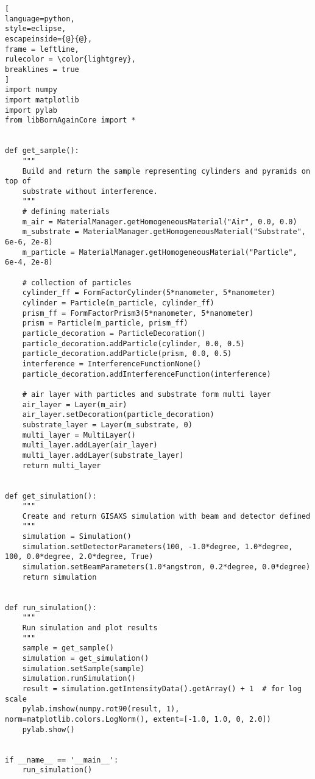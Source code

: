 \begin{lstlisting}[
language=python, 
style=eclipse, 
escapeinside={@}{@},
frame = leftline, 
rulecolor = \color{lightgrey},
breaklines = true
]
import numpy
import matplotlib
import pylab
from libBornAgainCore import *


def get_sample():
    """
    Build and return the sample representing cylinders and pyramids on top of
    substrate without interference.
    """
    # defining materials
    m_air = MaterialManager.getHomogeneousMaterial("Air", 0.0, 0.0)
    m_substrate = MaterialManager.getHomogeneousMaterial("Substrate", 6e-6, 2e-8)
    m_particle = MaterialManager.getHomogeneousMaterial("Particle", 6e-4, 2e-8)

    # collection of particles
    cylinder_ff = FormFactorCylinder(5*nanometer, 5*nanometer)
    cylinder = Particle(m_particle, cylinder_ff)
    prism_ff = FormFactorPrism3(5*nanometer, 5*nanometer)
    prism = Particle(m_particle, prism_ff)
    particle_decoration = ParticleDecoration()
    particle_decoration.addParticle(cylinder, 0.0, 0.5)
    particle_decoration.addParticle(prism, 0.0, 0.5)
    interference = InterferenceFunctionNone()
    particle_decoration.addInterferenceFunction(interference)

    # air layer with particles and substrate form multi layer
    air_layer = Layer(m_air)
    air_layer.setDecoration(particle_decoration)
    substrate_layer = Layer(m_substrate, 0)
    multi_layer = MultiLayer()
    multi_layer.addLayer(air_layer)
    multi_layer.addLayer(substrate_layer)
    return multi_layer


def get_simulation():
    """
    Create and return GISAXS simulation with beam and detector defined
    """
    simulation = Simulation()
    simulation.setDetectorParameters(100, -1.0*degree, 1.0*degree, 100, 0.0*degree, 2.0*degree, True)
    simulation.setBeamParameters(1.0*angstrom, 0.2*degree, 0.0*degree)
    return simulation


def run_simulation():
    """
    Run simulation and plot results
    """
    sample = get_sample()
    simulation = get_simulation()
    simulation.setSample(sample)
    simulation.runSimulation()
    result = simulation.getIntensityData().getArray() + 1  # for log scale
    pylab.imshow(numpy.rot90(result, 1), norm=matplotlib.colors.LogNorm(), extent=[-1.0, 1.0, 0, 2.0])
    pylab.show()


if __name__ == '__main__':
    run_simulation()

\end{lstlisting}


